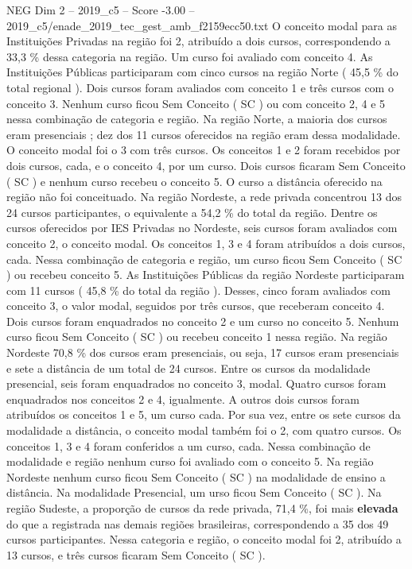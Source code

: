 \begin{textsample}{NEG Dim 2 – 2019\_c5 – Score -3.00 – 2019\_c5/enade\_2019\_tec\_gest\_amb\_f2159ecc50.txt}
O conceito modal para as Instituições Privadas na região foi 2, atribuído a dois cursos, correspondendo a 33,3 \% dessa categoria na região.
Um curso foi avaliado com conceito 4.
As Instituições Públicas participaram com cinco cursos na região Norte ( 45,5 \% do total regional ).
Dois cursos foram avaliados com conceito 1 e três cursos com o conceito 3.
Nenhum curso ficou Sem Conceito ( SC ) ou com conceito 2, 4 e 5 nessa combinação de categoria e região.
Na região Norte, a maioria dos cursos eram presenciais ; dez dos 11 cursos oferecidos na região eram dessa modalidade.
O conceito modal foi o 3 com três cursos.
Os conceitos 1 e 2 foram recebidos por dois cursos, cada, e o conceito 4, por um curso.
Dois cursos ficaram Sem Conceito ( SC ) e nenhum curso recebeu o conceito 5.
O curso a distância oferecido na região não foi conceituado.
Na região Nordeste, a rede privada concentrou 13 dos 24 cursos participantes, o equivalente a 54,2 \% do total da região.
Dentre os cursos oferecidos por IES Privadas no Nordeste, seis cursos foram avaliados com conceito 2, o conceito modal.
Os conceitos 1, 3 e 4 foram atribuídos a dois cursos, cada.
Nessa combinação de categoria e região, um curso ficou Sem Conceito ( SC ) ou recebeu conceito 5.
As Instituições Públicas da região Nordeste participaram com 11 cursos ( 45,8 \% do total da região ).
Desses, cinco foram avaliados com conceito 3, o valor modal, seguidos por três cursos, que receberam conceito 4.
Dois cursos foram enquadrados no conceito 2 e um curso no conceito 5.
Nenhum curso ficou Sem Conceito ( SC ) ou recebeu conceito 1 nessa região.
Na região Nordeste 70,8 \% dos cursos eram presenciais, ou seja, 17 cursos eram presenciais e sete a distância de um total de 24 cursos.
Entre os cursos da modalidade presencial, seis foram enquadrados no conceito 3, modal.
Quatro cursos foram enquadrados nos conceitos 2 e 4, igualmente.
A outros dois cursos foram atribuídos os conceitos 1 e 5, um curso cada.
Por sua vez, entre os sete cursos da modalidade a distância, o conceito modal também foi o 2, com quatro cursos.
Os conceitos 1, 3 e 4 foram conferidos a um curso, cada.
Nessa combinação de modalidade e região nenhum curso foi avaliado com o conceito 5.
Na região Nordeste nenhum curso ficou Sem Conceito ( SC ) na modalidade de ensino a distância.
Na modalidade Presencial, um urso ficou Sem Conceito ( SC ).
Na região Sudeste, a proporção de cursos da rede privada, 71,4 \%, foi mais \textbf{elevada} do que a registrada nas demais regiões brasileiras, correspondendo a 35 dos 49 cursos participantes.
Nessa categoria e região, o conceito modal foi 2, atribuído a 13 cursos, e três cursos ficaram Sem Conceito ( SC ).

\end{textsample}
